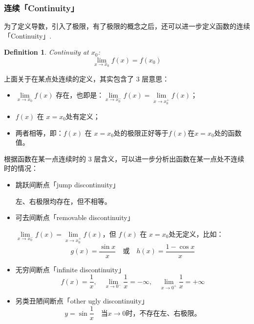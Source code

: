 \documentclass{ctexart}
\numberwithin{equation}{section}
\numberwithin{figure}{section}
\newtheorem{myDef}{Definition}[section]
\begin{document}
\subsubsection{连续「Continuity」}
为了定义导数，引入了极限，有了极限的概念之后，还可以进一步定义函数的连续「Continuity」.
\begin{myDef}\label{Def:Continuity}
    Continuity at \(x_0\):
    \begin{equation*}
        \lim\limits_{x\to x_0}f(x) = f(x_0)
    \end{equation*}
\end{myDef}
上面关于在某点处连续的定义，其实包含了 \(3\) 层意思：
\begin{itemize}
    \item \(\lim\limits_{x\to x_0}f(x)\) 存在，也即是：\(\lim\limits_{x \to x_0^{-}}f(x) = \lim\limits_{x \to x_0^{+}}f(x)\)；
    \item \(f(x)\) 在 \(x = x_0\)处有定义；
    \item 两者相等，即：\(f(x)\) 在 \(x = x_0\)处的极限正好等于\(f(x)\)在\(x = x_0\)处的函数值。
\end{itemize}
根据函数在某一点连续时的 \(3\) 层含义，可以进一步分析出函数在某一点处不连续时的情况：
\begin{itemize}
    \item 跳跃间断点「jump discontinuity」

          左、右极限均存在，但不相等。
    \item 可去间断点「removable discontinuity」

          \(\lim\limits_{x \to x_0^{-}}f(x) = \lim\limits_{x \to x_0^{+}}f(x)\)，但 \(f(x)\) 在 \(x = x_0\)处无定义，比如：
          \begin{equation*}
              g(x) = \frac{\sin x}{x} \quad \text{或} \quad h(x)=\frac{1-\cos x}{x}
          \end{equation*}

    \item 无穷间断点「infinite discontinuity」
          \[ f(x) = \frac{1}{x},\quad \lim\limits_{x\to 0^{-}}\frac{1}{x} = -\infty, \quad \lim\limits_{x\to 0^{+}}\frac{1}{x} = +\infty\]
    \item 另类丑陋间断点「other ugly discontinuity」
          \[ y = \sin \frac{1}{x} \quad \text{当}   x \to 0 \text{时，不存在左、右极限。}  \]

\end{itemize}
\end{document}
